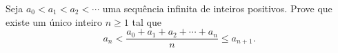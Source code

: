 Seja $a_0 < a_1 < a_2 < \cdots$ uma sequência infinita de inteiros positivos. Prove que existe um único inteiro $n\geq 1$ tal que \[a_n < \frac{a_0+a_1+a_2+\cdots+a_n}{n} \leq a_{n+1}.\]
